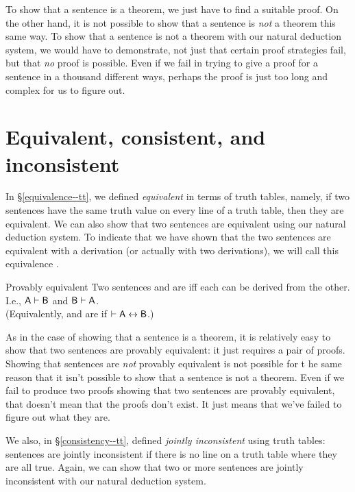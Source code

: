 To show that a sentence is a theorem, we just have to find a suitable proof. On the other hand, it is not possible to show that a sentence is \emph{not} a theorem this same way. To show that a sentence is not a theorem with our natural deduction system, we would have to demonstrate, not just that certain proof strategies fail, but that \emph{no} proof is possible. Even if we fail in trying to give a proof for a sentence in a thousand different ways, perhaps the proof is just too long and complex for us to figure out. 

\section{Equivalent, consistent, and inconsistent}

In \S\ref{equivalence--tt}, we defined \textit{equivalent} in terms of truth tables, namely, if two sentences have the same truth value on every line of a truth table, then they are equivalent. We can also show that two sentences are equivalent using our natural deduction system. To indicate that we have shown that the two sentences are equivalent with a derivation (or actually with two derivations), we will call this equivalence . 

\begin{factboxy}{Provably equivalent}
Two sentences  and  are  iff each can be derived from the other. I.e., $\mathsf{A}\vdash\mathsf{B}$ and $\mathsf{B}\vdash\mathsf{A}$.\\
(Equivalently,  and  are  if $\vdash \mathsf{A} \leftrightarrow \mathsf{B}$.)
\end{factboxy}
        
As in the case of showing that a sentence is a theorem, it is relatively easy to show that two sentences are provably equivalent: it just requires a pair of proofs. Showing that sentences are \emph{not} provably equivalent is not possible for t he same reason that it isn't possible to show that a sentence is not a theorem. Even if we fail to produce two proofs showing that two sentences are provably equivalent, that doesn't mean that the proofs don't exist. It just means that we've failed to figure out what they are. 

We also, in \S\ref{consistency--tt}, defined \textit{jointly inconsistent} using truth tables: sentences are jointly inconsistent if there is no line on a truth table where they are all true. Again, we can show that two or more sentences are jointly inconsistent with our natural deduction system. 


